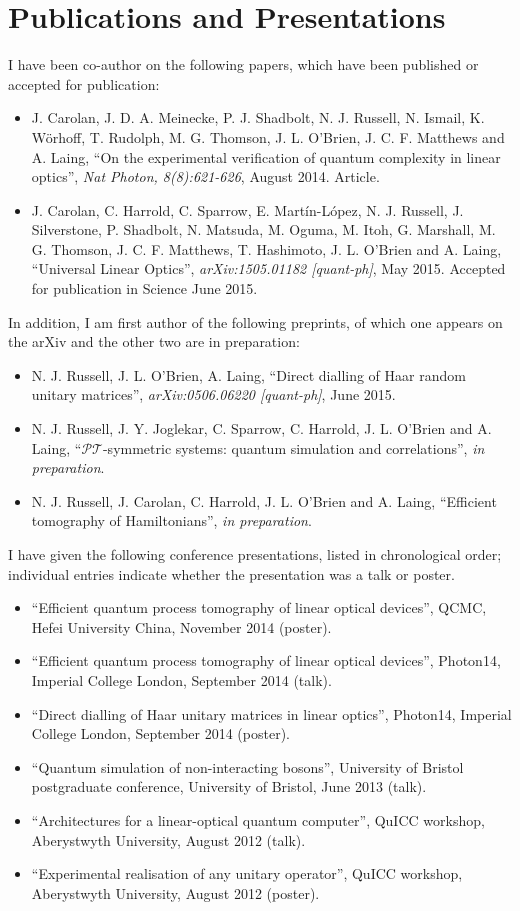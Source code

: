 \chapter{Publications and Presentations}
\label{app:publications}
I have been co-author on the following papers, which have been published or
accepted for publication:
\begin{itemize}
  \item J. Carolan, J. D. A. Meinecke, P. J. Shadbolt, N. J. Russell, N. Ismail,
    K. W\"orhoff, T. Rudolph, M. G. Thomson, J. L. O'Brien, J. C. F. Matthews
    and A. Laing, ``On the experimental verification of quantum complexity in
    linear optics'', \textit{Nat Photon, 8(8):621-626}, August 2014. Article.
  \item J. Carolan, C. Harrold, C. Sparrow, E. Mart\'in-L\'opez, N. J. Russell,
    J. Silverstone, P. Shadbolt, N. Matsuda, M. Oguma, M. Itoh, G. Marshall, M.
    G. Thomson, J. C. F. Matthews, T. Hashimoto, J. L. O'Brien and A. Laing,
    ``Universal Linear Optics'', \textit{arXiv:1505.01182 [quant-ph]}, May 2015.
    Accepted for publication in Science June 2015.
\end{itemize}
In addition, I am first author of the following preprints, of which one appears
on the arXiv and the other two are in preparation:
\begin{itemize}
  \item N. J. Russell, J. L. O'Brien, A. Laing, ``Direct dialling of Haar random
    unitary matrices'', \textit{arXiv:0506.06220 [quant-ph]}, June 2015.
  \item N. J. Russell, J. Y. Joglekar, C. Sparrow, C. Harrold, J. L. O'Brien and
    A. Laing, ``\(\mathcal{PT}\)-symmetric systems: quantum simulation and
    correlations'', \textit{in preparation}.
  \item N. J. Russell, J. Carolan, C. Harrold, J. L. O'Brien and A. Laing,
    ``Efficient tomography of Hamiltonians'', \textit{in preparation}.
\end{itemize}
I have given the following conference presentations, listed in chronological
order; individual entries indicate whether the presentation was a talk or
poster.
\begin{itemize}
  \item ``Efficient quantum process tomography of linear optical devices'',
    QCMC, Hefei University China, November 2014 (poster).
  \item ``Efficient quantum process tomography of linear optical devices'',
    Photon14, Imperial College London, September 2014 (talk).
  \item ``Direct dialling of Haar unitary matrices in linear optics'', Photon14,
    Imperial College London, September 2014 (poster).
  \item ``Quantum simulation of non-interacting bosons'', University of Bristol
    postgraduate conference, University of Bristol, June 2013 (talk).
  \item ``Architectures for a linear-optical quantum computer'', QuICC workshop,
    Aberystwyth University, August 2012 (talk).
  \item ``Experimental realisation of any unitary operator'', QuICC workshop,
    Aberystwyth University, August 2012 (poster).
\end{itemize}
